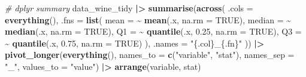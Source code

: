 \documentclass[
  doc,floatsintext]{apa6}
\newenvironment{Shaded}{\begin{snugshade}}{\end{snugshade}}
\newcommand{\AttributeTok}[1]{\textcolor[rgb]{0.13,0.29,0.53}{#1}}
\newcommand{\CommentTok}[1]{\textcolor[rgb]{0.56,0.35,0.01}{\textit{#1}}}
\newcommand{\ConstantTok}[1]{\textcolor[rgb]{0.56,0.35,0.01}{#1}}
\newcommand{\FloatTok}[1]{\textcolor[rgb]{0.00,0.00,0.81}{#1}}
\newcommand{\FunctionTok}[1]{\textcolor[rgb]{0.13,0.29,0.53}{\textbf{#1}}}
\newcommand{\NormalTok}[1]{#1}
\newcommand{\SpecialCharTok}[1]{\textcolor[rgb]{0.81,0.36,0.00}{\textbf{#1}}}
\newcommand{\StringTok}[1]{\textcolor[rgb]{0.31,0.60,0.02}{#1}}
\begin{document}
\begin{Shaded}
\begin{Highlighting}[]
\CommentTok{\# dplyr summary}
\NormalTok{data\_wine\_tidy }\SpecialCharTok{|\textgreater{}}
  \FunctionTok{summarise}\NormalTok{(}\FunctionTok{across}\NormalTok{(}
    \AttributeTok{.cols =} \FunctionTok{everything}\NormalTok{(),}
    \AttributeTok{.fns =} \FunctionTok{list}\NormalTok{(}
      \AttributeTok{mean   =} \SpecialCharTok{\textasciitilde{}} \FunctionTok{mean}\NormalTok{(.x, }\AttributeTok{na.rm =} \ConstantTok{TRUE}\NormalTok{),}
      \AttributeTok{median =} \SpecialCharTok{\textasciitilde{}} \FunctionTok{median}\NormalTok{(.x, }\AttributeTok{na.rm =} \ConstantTok{TRUE}\NormalTok{),}
      \AttributeTok{Q1     =} \SpecialCharTok{\textasciitilde{}} \FunctionTok{quantile}\NormalTok{(.x, }\FloatTok{0.25}\NormalTok{, }\AttributeTok{na.rm =} \ConstantTok{TRUE}\NormalTok{),}
      \AttributeTok{Q3     =} \SpecialCharTok{\textasciitilde{}} \FunctionTok{quantile}\NormalTok{(.x, }\FloatTok{0.75}\NormalTok{, }\AttributeTok{na.rm =} \ConstantTok{TRUE}\NormalTok{)}
\NormalTok{    ),}
    \AttributeTok{.names =} \StringTok{"\{.col\}\_\{.fn\}"}
\NormalTok{  )) }\SpecialCharTok{|\textgreater{}}
  \FunctionTok{pivot\_longer}\NormalTok{(}\FunctionTok{everything}\NormalTok{(),}
               \AttributeTok{names\_to  =} \FunctionTok{c}\NormalTok{(}\StringTok{"variable"}\NormalTok{, }\StringTok{"stat"}\NormalTok{),}
               \AttributeTok{names\_sep =} \StringTok{"\_"}\NormalTok{,}
               \AttributeTok{values\_to =} \StringTok{"value"}\NormalTok{) }\SpecialCharTok{|\textgreater{}}
  \FunctionTok{arrange}\NormalTok{(variable, stat)}



\end{Highlighting}
\end{Shaded}
\end{document}
